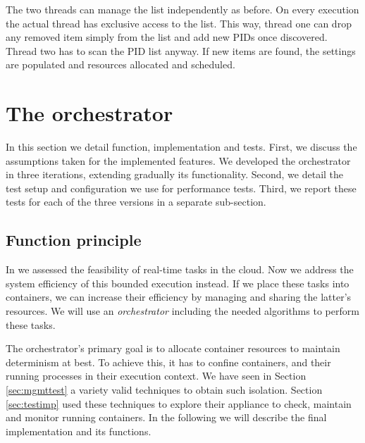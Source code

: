 \documentclass[]{scrartcl}
\begin{document}
The two threads can manage the list independently as before. On every execution the actual thread has exclusive access to the list.
This way, thread one can drop any removed item simply from the list and add new PIDs once discovered. 
Thread two has to scan the PID list anyway.
If new items are found, the settings are populated and resources allocated and scheduled.

\section{The orchestrator}
\label{sec:perftest}

In this section we detail function, implementation and tests.
First, we discuss the assumptions taken for the implemented features. 
We developed the orchestrator in three iterations, extending gradually its functionality.
Second, we detail the test setup and configuration we use for performance tests.
Third, we report these tests for each of the three versions in a separate sub-section. 

\subsection{Function principle}
\label{sub:funcdesc}

In \cite{Hoferetal2019} we assessed the feasibility of real-time tasks in the cloud. 
Now we address the system efficiency of this bounded execution instead.
If we place these tasks into containers, we can increase their efficiency by managing and sharing the latter's resources.
We will use an \emph{orchestrator} including the needed algorithms to perform these tasks.

The orchestrator's primary goal is to allocate container resources to maintain determinism at best.
To achieve this, it has to confine containers, and their running processes in their execution context.
We have seen in Section \ref{sec:mgmttest} a variety valid techniques to obtain such isolation.
Section \ref{sec:testimp} used these techniques to explore their appliance to check, maintain and monitor running containers.
In the following we will describe the final implementation and its functions.
\end{document}
